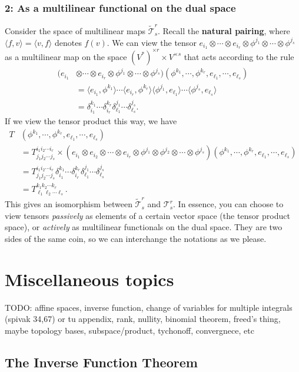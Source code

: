 \subsubsection*{2: As a multilinear functional on the dual space} 
Consider the space of multilinear maps $\widetilde{\mathcal{T} }  _s^r$. Recall the \textbf{natural pairing}, where $\langle f,v \rangle =\langle v,f \rangle $ denotes $f(v)$. We can view the tensor $e_{i_1}\otimes \cdots \otimes e_{i_r}\otimes \phi^{j_1}\otimes \cdots \otimes \phi^{j_s}$ as a multilinear map on the space $(V^*)^{\times r}\times V^{\times s}$ that acts according to the rule 
\begin{align*}
    (e_{i_1}&\otimes \cdots \otimes e_{i_r}\otimes \phi^{j_1}\otimes \cdots \otimes \phi^{j_s})(\phi^{k_1},\cdots ,\phi^{k_r},e_{\ell_1},\cdots ,e_{\ell_s} )\\
            &=\langle e_{i_1},\phi^{k_1} \rangle \cdots \langle e_{i_r},\phi^{k_r} \rangle \langle \phi^{j_1},e_{\ell_1} \rangle \cdots \langle \phi^{j_s},e_{\ell_s} \rangle \\
            &=\delta_{i_1}^{k_1}\cdots \delta^{k_r}_{i_r}\delta^{j_1}_{\ell_1}\cdots \delta^{j_s}_{\ell_s}.
\end{align*}
If we view the tensor product this way, we have
\begin{align*}
    T&(\phi^{k_1},\cdots, \phi^{k_r},e_{\ell_1},\cdots ,e_{\ell_s})\\
     &=T^{i_1i_2\cdots i_r}_{j_1j_2\cdots j_s}\times (e_{i_1}\otimes e_{i_2}\otimes \cdots \otimes e_{i_r}\otimes \phi^{j_1}\otimes \phi^{j_2}\otimes \cdots \otimes \phi^{j_s})(\phi^{k_1},\cdots ,\phi^{k_r},e_{\ell_1},\cdots ,e_{\ell_s})\\
                                                                  &=T^{i_1i_2\cdots i_r}_{j_1j_2\cdots j_s}\delta_{i_1}^{k_1}\cdots \delta^{k_r}_{i_r}\delta^{j_1}_{\ell_1}\cdots \delta_{\ell_s}^{j_s}\\
                                                                  &=T^{k_1k_2\cdots k_r}_{\ell_1\ell_2\cdots \ell_s}.
\end{align*}This gives an isomorphism between $\widetilde {\mathcal{T} } _s^r$ and $\mathcal{T} _s^r$. In essence, you can choose to view tensors \emph{passively} as elements of a certain vector space (the tensor product space), or \emph{actively} as multilinear functionals on the dual space. They are two sides of the same coin, so we can interchange the notations as we please.
\section{Miscellaneous topics}
TODO: affine spaces, inverse function, change of variables for multiple integrals (spivak 34,67) or tu appendix, rank, nullity, binomial theorem, freed's thing, maybe topology bases, subspace/product, tychonoff, convergnece, etc

\subsection{The Inverse Function Theorem}



